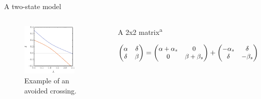 \documentclass[xcolor=x11names,compress]{beamer}
\renewcommand{\(}{\begin{columns}}
\renewcommand{\)}{\end{columns}}
\newcommand{\<}[1]{\begin{column}{#1}}
\renewcommand{\>}{\end{column}}
\begin{document}
\begin{frame}{A two-state model}

\begin{columns}


\begin{figure}
    \centering
    \includegraphics[width=0.8\textwidth]{avoidedcrossing.pdf}
    \caption{Example of an avoided crossing.}
    \label{fig:my_label}
\end{figure}


\begin{beamerboxesrounded}[scheme=foncé]{A 2x2 matrix\textsuperscript{a}}

$

\small{\centering \begin{pmatrix}
   \alpha & \delta \\
   \delta & \beta 
\end{pmatrix} = 

\vspace{0.3cm}

\begin{pmatrix}

   \alpha + \alpha_s & 0 \\
   0 & \beta + \beta_s
\end{pmatrix} +
\begin{pmatrix}
   - \alpha_s & \delta \\
   \delta & - \beta_s
\end{pmatrix}}
$

\end{beamerboxesrounded}
\vspace{1cm}
\end{columns}

    
\end{frame}
\end{document}
